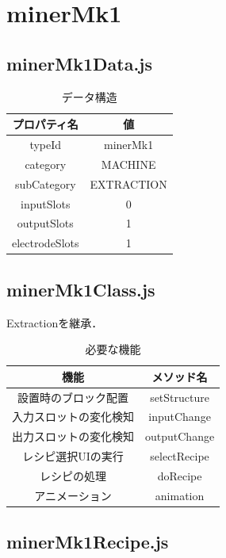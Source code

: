 \documentclass[uplatex,dvipdfmx,report]{jlreq}
\begin{document}
\section{minerMk1}

\subsection{minerMk1Data.js}

\begin{table}[H]
    \centering
    \caption{データ構造}
    \begin{tabular}{cc}
        \hline
        プロパティ名 & 値 \\
        \hline
        \hline
        typeId & minerMk1 \\
        category & MACHINE \\
        subCategory & EXTRACTION \\
        inputSlots & 0 \\
        outputSlots & 1 \\
        electrodeSlots & 1 \\
        \hline
    \end{tabular}
\end{table}

\subsection{minerMk1Class.js}

Extractionを継承．

\begin{table}[H]
    \centering
    \caption{必要な機能}
    \begin{tabular}{cc}
        \hline
        機能 & メソッド名 \\
        \hline
        \hline
        設置時のブロック配置 & setStructure \\
        入力スロットの変化検知 & inputChange \\
        出力スロットの変化検知 & outputChange \\
        レシピ選択UIの実行 & selectRecipe \\
        レシピの処理 & doRecipe \\
        アニメーション & animation \\
        \hline
    \end{tabular}
\end{table}

\subsection{minerMk1Recipe.js}
\end{document}
